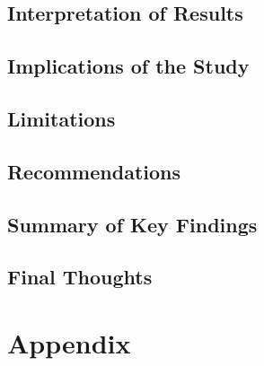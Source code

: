 \documentclass[
  11pt,
  letterpaper,
  DIV=11,
  numbers=noendperiod]{scrartcl}
\begin{document}
\subsection{Interpretation of Results}\label{interpretation-of-results}

\subsection{Implications of the Study}\label{implications-of-the-study}

\subsection{Limitations}\label{limitations}

\subsection{Recommendations}\label{recommendations}

\subsection{Summary of Key Findings}\label{summary-of-key-findings}

\subsection{Final Thoughts}\label{final-thoughts}

\section{Appendix}\label{appendix}
\end{document}
